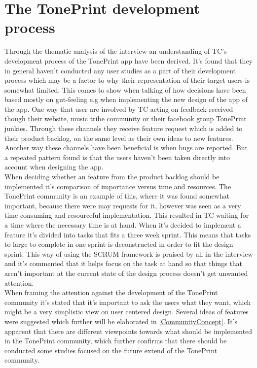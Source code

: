 \section{The TonePrint development process}
\label{TonePrintDevelopmentProcess}
%
Through the thematic analysis of the interview an understanding of TC's development process of the TonePrint app have been derived. It's found that they in general haven't conducted any user studies as a part of their development process which may be a factor to why their representation of their target users is somewhat limited. This comes to show when talking of how decisions have been based mostly on gut-feeling e.g when implementing the new design of the app of the app. One way that user are involved by TC acting on feedback received though their website, music tribe community or their facebook group TonePrint junkies. Through these channels they receive feature request which is added to their product backlog, on the same level as their own ideas to new features. Another way these channels have been beneficial is when bugs are reported. But a repeated pattern found is that the users haven't been taken directly into account when designing the app.\\
When deciding whether an feature from the product backlog should be implemented it's comparison of importance versus time and resources. The TonePrint community is an example of this, where it was found somewhat important, because there were may requests for it, however was seen as a very time consuming and resourceful implementation. This resulted in TC waiting for a time where the necessary time is at hand. When it's decided to implement a feature it's divided into tasks that fits a three week sprint. This means that tasks to large to complete in one sprint is deconstructed in order to fit the design sprint. This way of using the SCRUM framework is praised by all in the interview and it's commented that it helps focus on the task at hand so that things that aren't important at the current state of the design process doesn't get unwanted attention.\\
When framing the attention against the development of the TonePrint community it's stated that it's important to ask the users what they want, which might be a very simplistic view on user centered design. Several ideas of features were suggested which further will be elaborated in \autoref{CommunityConcept}. It's apparent that there are different viewpoints towards what should be implemented in the TonePrint community, which further confirms that there should be conducted some studies focused on the future extend of the TonePrint community. 





